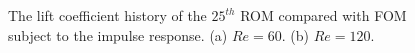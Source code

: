 \begin{figure}
\centering 
\begin{subfigure}{0.495\textwidth}
\centering
    \caption{}
    \label{•}
    \end{subfigure}  
\begin{subfigure}{0.495\textwidth}
\centering
    \caption{}
    \label{•}
    \end{subfigure} 
  \caption{The lift coefficient history of the $25^{th}$ 
     ROM compared with FOM subject to the impulse response.
     (a) $Re=60$. (b) $Re=120$. }
\label{fig:signal}  
\end{figure}

%

